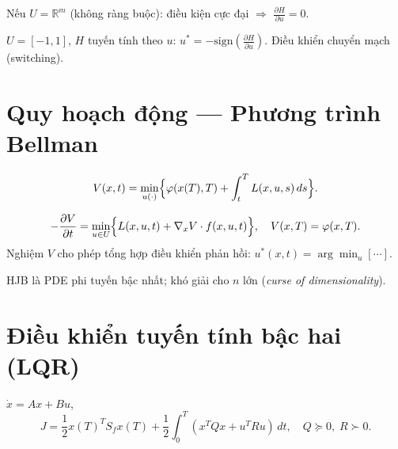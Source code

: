 \documentclass[12pt,a4paper]{article}
\begin{document}
\begin{luuy}
  Nếu $U = \mathbb{R}^m$ (không ràng buộc): điều kiện cực đại $\Rightarrow$ $\frac{\partial H}{\partial u} = 0$.
\end{luuy}

\begin{vidu}[title={Bang-bang control}]
  $U = [-1, 1]$, $H$ tuyến tính theo $u$: $u^* = -\text{sign}(\frac{\partial H}{\partial u})$. Điều khiển chuyển mạch (switching).
\end{vidu}

\section{Quy hoạch động --- Phương trình Bellman}

\begin{dinhnghia}[title={Hàm giá trị}]
  \[
    V(x, t) = \min_{u(\cdot)} \Bigl\{\varphi(x(T), T) + \int_t^T L(x, u, s)\,ds\Bigr\}.
  \]
\end{dinhnghia}

\begin{dinhly}[title={Phương trình Hamilton--Jacobi--Bellman (HJB)}]
  \[
    -\frac{\partial V}{\partial t} = \min_{u \in U}\Bigl\{L(x, u, t) + \nabla_x V \cdot f(x, u, t)\Bigr\}, \quad V(x, T) = \varphi(x, T).
  \]
  Nghiệm $V$ cho phép tổng hợp điều khiển phản hồi: $u^*(x, t) = \arg\min_{u}[\cdots]$.
\end{dinhly}

\begin{luuy}
  HJB là PDE phi tuyến bậc nhất; khó giải cho $n$ lớn (\textit{curse of dimensionality}).
\end{luuy}

\section{Điều khiển tuyến tính bậc hai (LQR)}

\begin{dinhnghia}[title={Bài toán LQR}]
  $\dot{x} = Ax + Bu$,
  \[
    J = \frac{1}{2}x(T)^T S_f x(T) + \frac{1}{2}\int_0^T (x^T Qx + u^T Ru)\,dt, \quad Q \succeq 0,\; R \succ 0.
  \]
\end{dinhnghia}
\end{document}
